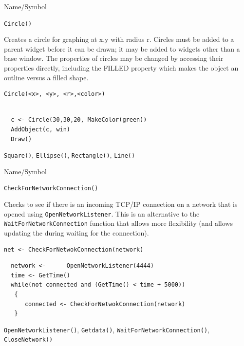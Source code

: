 \begin{desc}{Name/Symbol}
\item[Name/Symbol]	\verb+Circle()+

\item[Description] Creates a circle for graphing at x,y with radius r.
  Circles must be added to a parent widget before it can be drawn; it
  may be added to widgets other than a base window. The properties of
  circles may be changed by accessing their properties directly,
  including the FILLED property which makes the object an outline
  versus a filled shape.


\item[Usage]
\begin{verbatim}
Circle(<x>, <y>, <r>,<color>)
\end{verbatim}

\item[Example]	
\begin{verbatim}
  
  c <- Circle(30,30,20, MakeColor(green))
  AddObject(c, win)
  Draw()

\end{verbatim}
\item[See Also]	\verb+Square()+, \verb+Ellipse()+, \verb+Rectangle()+, \verb+Line()+
\end{desc}


\begin{desc}{Name/Symbol}
\item[Name/Symbol]	\verb+CheckForNetworkConnection()+

\item[Description] Checks to see if there is an incoming TCP/IP connection on a network that is opened using \verb+OpenNetworkListener+.  This is an alternative to the \verb+WaitForNetworkConnection+ function that allows more flexibility (and allows updating the during waiting for the connection).

\item[Usage]
\begin{verbatim}
net <- CheckForNetwokConnection(network)
\end{verbatim}

\item[Example]	
\begin{verbatim}
  network <-      OpenNetworkListener(4444) 
  time <- GetTime()
  while(not connected and (GetTime() < time + 5000))
   {
      connected <- CheckForNetwokConnection(network) 
   }

\end{verbatim}
\item[See Also]	\verb+OpenNetworkListener()+, \verb+Getdata()+, \verb+WaitForNetworkConnection()+, \verb+CloseNetwork()+
\end{desc}



